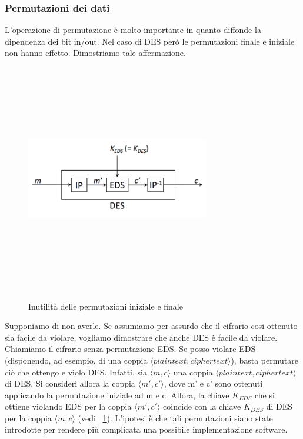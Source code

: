 \subsubsection{Permutazioni dei dati}
L'operazione di permutazione è molto importante in quanto diffonde la dipendenza dei bit in/out. Nel caso di DES però le permutazioni finale e iniziale non hanno effetto. Dimostriamo tale affermazione. \newline
\begin{figure}[htbp]
	\centering%
	\subfigure%
	{\includegraphics[height=10cm, width=8cm, keepaspectratio]{Immagini/Capitolo2/des_perm_3.png}}
	\caption{Inutilità delle permutazioni iniziale e finale \label{fig:des_perm_3}} 	
\end{figure}
Supponiamo di non averle. Se assumiamo per assurdo che il cifrario cosi ottenuto sia facile da violare, vogliamo dimostrare che anche DES è facile da violare. Chiamiamo il cifrario senza permutazione EDS. Se posso violare EDS (disponendo, ad esempio, di una coppia $\langle plaintext, ciphertext \rangle$), basta permutare ciò che ottengo e violo DES. Infatti, sia $\langle m, c \rangle$ una coppia $\langle plaintext, ciphertext \rangle$ di DES. Si consideri allora la coppia $\langle m', c' \rangle$, dove m' e c' sono ottenuti applicando la permutazione iniziale ad m e c. Allora, la chiave $K_{EDS}$ che si ottiene violando EDS per la
coppia $\langle m', c' \rangle$ coincide con la chiave $K_{DES}$ di DES per la
coppia $\langle m, c \rangle$ (vedi \figurename ~\ref{fig:des_perm_3}). L'ipotesi è che tali permutazioni siano state introdotte per rendere più complicata una possibile implementazione software.
